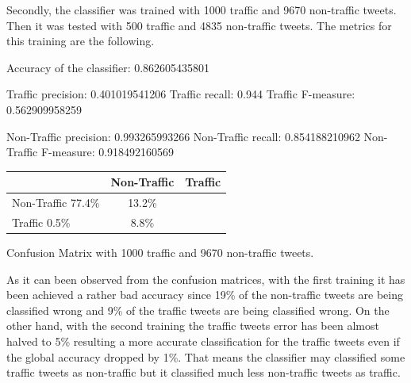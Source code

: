 Secondly, the classifier was trained with 1000 traffic and 9670 non-traffic tweets. Then it was tested with 500 traffic and 4835 non-traffic tweets. The metrics for this training are the following. 

Accuracy of the classifier:   0.862605435801

Traffic precision:            0.401019541206
Traffic recall:               0.944
Traffic F-measure:            0.562909958259

Non-Traffic precision:        0.993265993266
Non-Traffic recall:           0.854188210962
Non-Traffic F-measure:        0.918492160569

\begin{tabular}{| l || c | c | }
    \hline
          & Non-Traffic & Traffic \\ \hline \hline
        Non-Traffic 77.4\% & 13.2\% \\ \hline
        Traffic 0.5\% & 8.8\% \\ \hline
    \end{tabular}
    \caption{Confusion Matrix with 1000 traffic and 9670 non-traffic tweets.}
    \label{fig:confusionMatrix1}
	
As it can been observed from the confusion matrices, with the first training it has been achieved a rather bad accuracy since 19\% of the non-traffic tweets are being classified wrong and 9\% of the traffic tweets are being classified wrong. On the other hand, with the second training the traffic tweets error has been almost halved to 5\% resulting a more accurate classification for the traffic tweets even if the global accuracy dropped by 1\%. That means the classifier may classified some traffic tweets as non-traffic but it classified much less non-traffic tweets as traffic.

